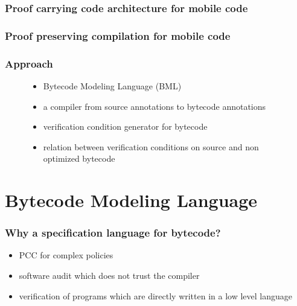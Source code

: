 \documentclass{beamer}
\begin{document}
\begin{frame}[shrink]
\frametitle{Proof carrying code architecture for mobile code}
\begin{figure}[hc]
\begin{center}
\end{center}
\end{figure}
\end{frame}

\begin{frame}[shrink]
\frametitle{Proof preserving compilation for mobile code}
\begin{figure}[hc]
\begin{center}
\end{center}
\end{figure}
\end{frame}

\begin{frame}[shrink]
\frametitle{Approach}
\begin{figure}[hc]
\begin{center}
\begin{itemize} 
       \item Bytecode Modeling Language (BML)  
       \item a compiler from source annotations to bytecode annotations
       \item verification condition generator for bytecode  
       \item relation between verification conditions on source and non optimized bytecode    
             
\end{itemize}
\end{center}
\end{figure}
\end{frame}


\section{Bytecode Modeling Language}
\begin{frame}[shrink]
\frametitle{Why a specification language for bytecode?}
   \begin{itemize}
     \item PCC for complex policies 
     \item software audit which does not trust the compiler
     \item verification of programs which are directly written in a low level language
   \end{itemize}  
\end{frame}
\end{document}
